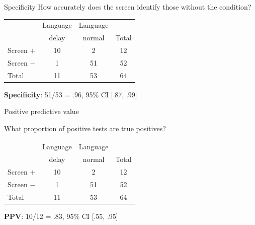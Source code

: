 \documentclass{beamer}
\begin{document}
\begin{frame}{Specificity}
How accurately does the screen identify those \alert{without} the condition? \\

\begin{center}
\begin{tabular}{l | c | c | c}
\toprule
& Language & Language & \\
& delay & normal & Total \\ 
\hline
Screen $+$ & 10 & \alert{2} & 12 \\
\hline
Screen $-$ & 1 & \alert{51} & 52 \\
\hline
Total & 11 & \alert{53} & 64 \\
\bottomrule
\end{tabular}
\end{center}

\begin{center}
\textbf{Specificity}: 51/53 = .96, 95\% CI [.87, .99]
\end{center}
\end{frame}

\begin{frame}{Positive predictive value}
\begin{center}
What proportion of positive tests are true positives? \\
\end{center}

\begin{center}
\begin{tabular}{l | c | c | c}
\toprule
& Language & Language & \\
& delay & normal & Total \\ 
\hline
Screen $+$ & \alert{10} & \alert{2} & \alert{12} \\
\hline
Screen $-$ & 1 & 51 & 52 \\
\hline
Total & 11 & 53 & 64 \\
\bottomrule
\end{tabular}
\end{center}

\begin{center}
\textbf{PPV}: 10/12 = .83, 95\% CI [.55, .95]
\end{center}
\end{frame}
\end{document}
